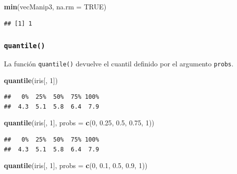 \documentclass[]{book}
\newenvironment{Shaded}{\begin{snugshade}}{\end{snugshade}}
\newcommand{\KeywordTok}[1]{\textcolor[rgb]{0.13,0.29,0.53}{\textbf{#1}}}
\newcommand{\DataTypeTok}[1]{\textcolor[rgb]{0.13,0.29,0.53}{#1}}
\newcommand{\DecValTok}[1]{\textcolor[rgb]{0.00,0.00,0.81}{#1}}
\newcommand{\FloatTok}[1]{\textcolor[rgb]{0.00,0.00,0.81}{#1}}
\newcommand{\OtherTok}[1]{\textcolor[rgb]{0.56,0.35,0.01}{#1}}
\newcommand{\NormalTok}[1]{#1}
\begin{document}
\begin{Shaded}
\begin{Highlighting}[]
\KeywordTok{min}\NormalTok{(vecManip3, }\DataTypeTok{na.rm =} \OtherTok{TRUE}\NormalTok{)}
\end{Highlighting}
\end{Shaded}

\begin{verbatim}
## [1] 1
\end{verbatim}

\subsubsection{\texorpdfstring{\texttt{quantile()}}{quantile()}}\label{l015quantile}

La función \texttt{quantile()} devuelve el cuantil definido por el
argumento \texttt{probs}.

\begin{Shaded}
\begin{Highlighting}[]
\KeywordTok{quantile}\NormalTok{(iris[, }\DecValTok{1}\NormalTok{])}
\end{Highlighting}
\end{Shaded}

\begin{verbatim}
##   0%  25%  50%  75% 100% 
##  4.3  5.1  5.8  6.4  7.9
\end{verbatim}

\begin{Shaded}
\begin{Highlighting}[]
\KeywordTok{quantile}\NormalTok{(iris[, }\DecValTok{1}\NormalTok{], }\DataTypeTok{probs =} \KeywordTok{c}\NormalTok{(}\DecValTok{0}\NormalTok{, }\FloatTok{0.25}\NormalTok{, }\FloatTok{0.5}\NormalTok{, }\FloatTok{0.75}\NormalTok{, }\DecValTok{1}\NormalTok{))}
\end{Highlighting}
\end{Shaded}

\begin{verbatim}
##   0%  25%  50%  75% 100% 
##  4.3  5.1  5.8  6.4  7.9
\end{verbatim}

\begin{Shaded}
\begin{Highlighting}[]
\KeywordTok{quantile}\NormalTok{(iris[, }\DecValTok{1}\NormalTok{], }\DataTypeTok{probs =} \KeywordTok{c}\NormalTok{(}\DecValTok{0}\NormalTok{, }\FloatTok{0.1}\NormalTok{, }\FloatTok{0.5}\NormalTok{, }\FloatTok{0.9}\NormalTok{, }\DecValTok{1}\NormalTok{))}
\end{Highlighting}
\end{Shaded}
\end{document}
